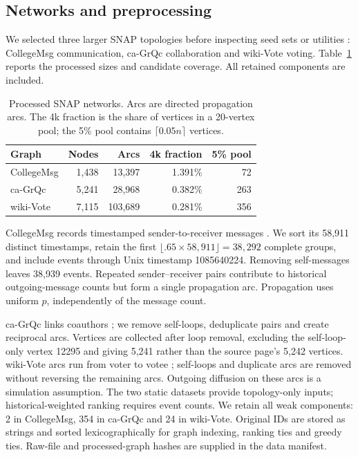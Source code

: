 \documentclass[smallextended]{svjour3}
\begin{document}
\subsection{Networks and preprocessing}
We selected three larger SNAP topologies before inspecting seed sets or utilities \cite{snap}: CollegeMsg communication, ca-GrQc collaboration and wiki-Vote voting. Table~\ref{tab:data} reports the processed sizes and candidate coverage. All retained components are included.
\begin{table}[htbp]
\caption{Processed SNAP networks. Arcs are directed propagation arcs. The 4k fraction is the share of vertices in a 20-vertex pool; the 5\% pool contains $\lceil 0.05n\rceil$ vertices.}\label{tab:data}
\begin{tabular}{lrrrr}
\toprule
Graph & Nodes & Arcs & 4k fraction & 5\% pool \\
\midrule
CollegeMsg & 1,438 & 13,397 & 1.391\% & 72 \\
ca-GrQc & 5,241 & 28,968 & 0.382\% & 263 \\
wiki-Vote & 7,115 & 103,689 & 0.281\% & 356 \\
\bottomrule
\end{tabular}
\end{table}

CollegeMsg records timestamped sender-to-receiver messages \cite{college}. We sort its 58,911 distinct timestamps, retain the first $\lfloor .65\times58,911\rfloor=38,292$ complete groups, and include events through Unix timestamp 1085640224. Removing self-messages leaves 38,939 events. Repeated sender--receiver pairs contribute to historical outgoing-message counts but form a single propagation arc. Propagation uses uniform $p$, independently of the message count.

ca-GrQc links coauthors \cite{grqc}; we remove self-loops, deduplicate pairs and create reciprocal arcs. Vertices are collected after loop removal, excluding the self-loop-only vertex 12295 and giving 5,241 rather than the source page's 5,242 vertices. wiki-Vote arcs run from voter to votee \cite{signed,links}; self-loops and duplicate arcs are removed without reversing the remaining arcs. Outgoing diffusion on these arcs is a simulation assumption. The two static datasets provide topology-only inputs; historical-weighted ranking requires event counts. We retain all weak components: 2 in CollegeMsg, 354 in ca-GrQc and 24 in wiki-Vote. Original IDs are stored as strings and sorted lexicographically for graph indexing, ranking ties and greedy ties. Raw-file and processed-graph hashes are supplied in the data manifest.
\end{document}
